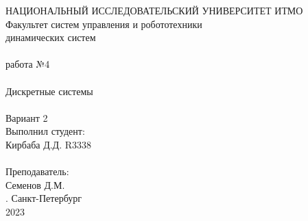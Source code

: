 \documentclass[12pt]{article}
\begin{document}
\begin{titlepage}
\begin{center}
    {\small НАЦИОНАЛЬНЫЙ ИССЛЕДОВАТЕЛЬСКИЙ УНИВЕРСИТЕТ ИТМО} \\
    {\small Факультет систем управления и робототехники} \\
    \vspace*{10\baselineskip}
    { динамических систем} \\
    \ \\
    { работа №4} \\
    \ \\
    {\LARGE Дискретные системы} \\
    \ \\
    Вариант 2 \\
    \vspace*{10\baselineskip}
    \hfill {\small Выполнил студент:} \\
    \hfill {\small Кирбаба Д.Д. R3338} \\
    \ \\
    \hfill {\small Преподаватель:} \\
    \hfill {\small Семенов Д.М.} \\
    \mbox{}
    \vfill {. Санкт-Петербург\\2023}
\end{center}
\end{titlepage}
\end{document}
